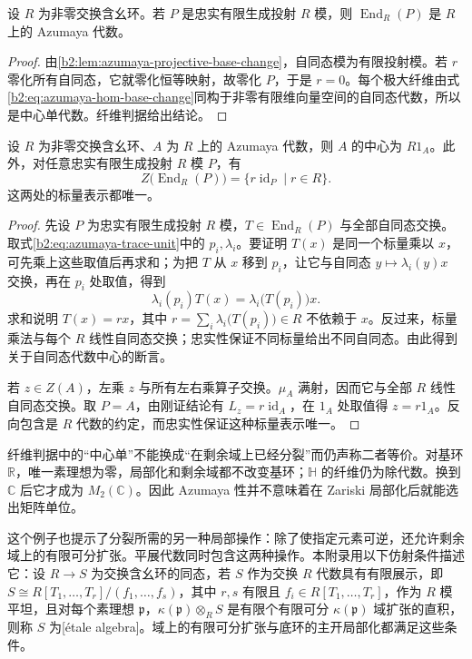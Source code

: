 \begin{corollary}\label{b2:cor:azumaya-endomorphism}
	设 \(R\) 为非零交换含幺环。若 \(P\) 是忠实有限生成投射 \(R\) 模，则 \(\operatorname{End}_R(P)\) 是 \(R\) 上的 Azumaya 代数。
\end{corollary}
\begin{proof}
	由\cref{b2:lem:azumaya-projective-base-change}，自同态模为有限投射模。若 \(r\) 零化所有自同态，它就零化恒等映射，故零化 \(P\)，于是 \(r=0\)。每个极大纤维由式\eqref{b2:eq:azumaya-hom-base-change}同构于非零有限维向量空间的自同态代数，所以是中心单代数。纤维判据给出结论。
\end{proof}

\begin{proposition}\label{b2:prop:azumaya-center}
	设 \(R\) 为非零交换含幺环、\(A\) 为 \(R\) 上的 Azumaya 代数，则 \(A\) 的中心为 \(R1_A\)。此外，对任意忠实有限生成投射 \(R\) 模 \(P\)，有
	\[
		Z\bigl(\operatorname{End}_R(P)\bigr) =\{r\operatorname{id}_P\mid r\in R\}.
	\]
	这两处的标量表示都唯一。
\end{proposition}
\begin{proof}
	先设 \(P\) 为忠实有限生成投射 \(R\) 模，\(T\in\operatorname{End}_R(P)\) 与全部自同态交换。取式\eqref{b2:eq:azumaya-trace-unit}中的 \(p_i,\lambda_i\)。要证明 \(T(x)\) 是同一个标量乘以 \(x\)，可先乘上这些取值后再求和；为把 \(T\) 从 \(x\) 移到 \(p_i\)，让它与自同态 \(y\mapsto\lambda_i(y)x\) 交换，再在 \(p_i\) 处取值，得到
	\[
		\lambda_i(p_i)T(x)=\lambda_i\bigl(T(p_i)\bigr)x.
	\]
	求和说明 \(T(x)=rx\)，其中 \(r=\sum_i\lambda_i\bigl(T(p_i)\bigr)\in R\) 不依赖于 \(x\)。反过来，标量乘法与每个 \(R\) 线性自同态交换；忠实性保证不同标量给出不同自同态。由此得到关于自同态代数中心的断言。

	若 \(z\in Z(A)\)，左乘 \(z\) 与所有左右乘算子交换。\(\mu_A\) 满射，因而它与全部 \(R\) 线性自同态交换。取 \(P=A\)，由刚证结论有 \(L_z=r\operatorname{id}_A\)，在 \(1_A\) 处取值得 \(z=r1_A\)。反向包含是 \(R\) 代数的约定，而忠实性保证这种标量表示唯一。
\end{proof}

纤维判据中的“中心单”不能换成“在剩余域上已经分裂”而仍声称二者等价。对基环 \(\mathbb R\)，唯一素理想为零，局部化和剩余域都不改变基环；\(\mathbb H\) 的纤维仍为除代数。换到 \(\mathbb C\) 后它才成为 \(M_2(\mathbb C)\)。因此 Azumaya 性并不意味着在 Zariski 局部化后就能选出矩阵单位。

\ProseParagraphBreak
这个例子也提示了分裂所需的另一种局部操作：除了使指定元素可逆，还允许剩余域上的有限可分扩张。平展代数同时包含这两种操作。本附录用以下仿射条件描述它：设 \(R\to S\) 为交换含幺环的同态，若 \(S\) 作为交换 \(R\) 代数具有有限展示，即 \(S\cong R[T_1,\ldots,T_r]/(f_1,\ldots,f_s)\)，其中 \(r,s\) 有限且 \(f_i\in R[T_1,\ldots,T_r]\)，作为 \(R\) 模平坦，且对每个素理想 \(\mathfrak p\)，\(\kappa(\mathfrak p)\otimes_RS\) 是有限个有限可分 \(\kappa(\mathfrak p)\) 域扩张的直积，则称 \(S\) 为[étale algebra]。域上的有限可分扩张与底环的主开局部化都满足这些条件。

